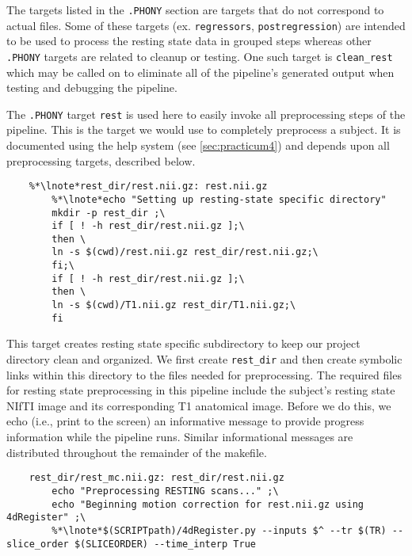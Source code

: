  The targets listed in the \texttt{.PHONY} section are targets that do not correspond to actual files.   Some of these targets (ex. \texttt{regressors}, \texttt{postregression}) are intended to be used to process the resting state data in grouped steps whereas other \texttt{.PHONY} targets are related to cleanup or testing. One such target is \texttt{clean_rest} which may be called on to eliminate all of the pipeline's generated output when testing and debugging the pipeline.


The \texttt{.PHONY} target \texttt{rest} is used here to easily invoke all preprocessing steps of the pipeline. This is the target we would use to completely preprocess a subject. It is documented using the help system (see \autoref{sec:practicum4}) and depends upon all preprocessing targets, described below.

\begin{lstlisting}
	%*\lnote*rest_dir/rest.nii.gz: rest.nii.gz 
		%*\lnote*echo "Setting up resting-state specific directory" 
		mkdir -p rest_dir ;\
		if [ ! -h rest_dir/rest.nii.gz ];\
		then \
		ln -s $(cwd)/rest.nii.gz rest_dir/rest.nii.gz;\
		fi;\
		if [ ! -h rest_dir/rest.nii.gz ];\
		then \
		ln -s $(cwd)/T1.nii.gz rest_dir/T1.nii.gz;\
		fi
\end{lstlisting}

\lnum{4} This target creates resting state specific subdirectory to keep our project directory clean and organized. We first create \texttt{rest_dir} and then create symbolic links within this directory to the files needed for preprocessing. The required files for resting state preprocessing in this pipeline include the subject's resting state NIfTI image and its corresponding T1 anatomical image.   Before we do this, we echo (i.e., print to the screen) an informative message to provide progress information while the pipeline runs. Similar informational messages are distributed throughout the remainder of the makefile.

\begin{lstlisting}
	rest_dir/rest_mc.nii.gz: rest_dir/rest.nii.gz
		echo "Preprocessing RESTING scans..." ;\
		echo "Beginning motion correction for rest.nii.gz using 4dRegister" ;\
		%*\lnote*$(SCRIPTpath)/4dRegister.py --inputs $^ --tr $(TR) --slice_order $(SLICEORDER) --time_interp True

\end{lstlisting}

